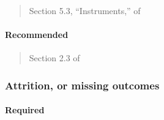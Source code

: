 \documentclass[12pt]{article}
\begin{document}
\begin{verse}
  Section 5.3, ``Instruments,'' of  \end{verse}

\begin{verse}
 \end{verse}

\paragraph*{Recommended}

\begin{verse} Section 2.3 of  \end{verse}

\begin{verse}  \end{verse}

\begin{verse}  \end{verse}

\begin{verse}  \end{verse}

\begin{verse}  \end{verse}

\begin{verse}  \end{verse}

\begin{verse}  \end{verse}

\begin{verse}  \end{verse}

\begin{verse}  \end{verse}

\subsubsection{Attrition, or missing outcomes}

\paragraph*{Required}
\end{document}
